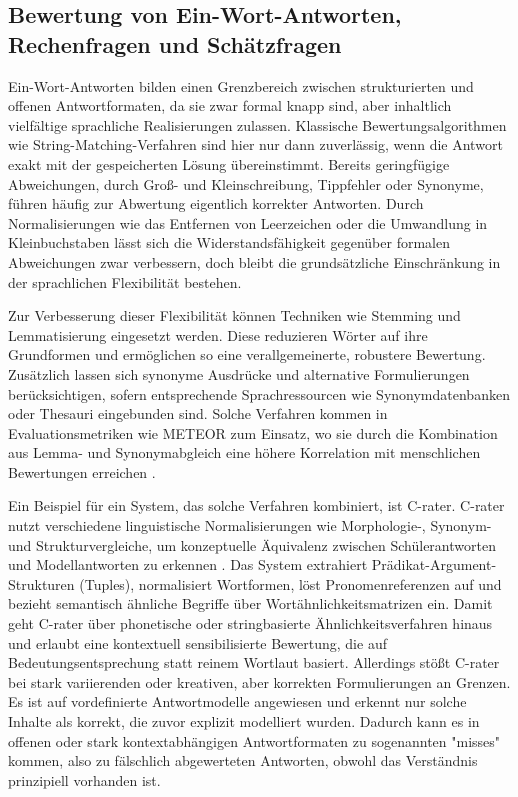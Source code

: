 \documentclass[a4paper,12pt]{article}
\begin{document}
\subsection{Bewertung von Ein-Wort-Antworten, Rechenfragen und Schätzfragen}
Ein-Wort-Antworten bilden einen Grenzbereich zwischen strukturierten und offenen Antwortformaten, da sie zwar formal knapp sind, aber inhaltlich vielfältige sprachliche Realisierungen zulassen. Klassische Bewertungsalgorithmen wie String-Matching-Verfahren sind hier nur dann zuverlässig, wenn die Antwort exakt mit der gespeicherten Lösung übereinstimmt. Bereits geringfügige Abweichungen, durch Groß- und Kleinschreibung, Tippfehler oder Synonyme, führen häufig zur Abwertung eigentlich korrekter Antworten. Durch Normalisierungen wie das Entfernen von Leerzeichen oder die Umwandlung in Kleinbuchstaben lässt sich die Widerstandsfähigkeit gegenüber formalen Abweichungen zwar verbessern, doch bleibt die grundsätzliche Einschränkung in der sprachlichen Flexibilität bestehen.

Zur Verbesserung dieser Flexibilität können Techniken wie Stemming und Lemmatisierung eingesetzt werden. Diese reduzieren Wörter auf ihre Grundformen und ermöglichen so eine verallgemeinerte, robustere Bewertung. Zusätzlich lassen sich synonyme Ausdrücke und alternative Formulierungen berücksichtigen, sofern entsprechende Sprachressourcen wie Synonymdatenbanken oder Thesauri eingebunden sind. Solche Verfahren kommen in Evaluationsmetriken wie METEOR zum Einsatz, wo sie durch die Kombination aus Lemma- und Synonymabgleich eine höhere Korrelation mit menschlichen Bewertungen erreichen \parencite[Kapitel~35.6.2]{mitkov}.

Ein Beispiel für ein System, das solche Verfahren kombiniert, ist C-rater. C-rater nutzt verschiedene linguistische Normalisierungen wie Morphologie-, Synonym- und Strukturvergleiche, um konzeptuelle Äquivalenz zwischen Schülerantworten und Modellantworten zu erkennen \parencite[vgl.][S.~389ff.]{leacock}. Das System extrahiert Prädikat-Argument-Strukturen (Tuples), normalisiert Wortformen, löst Pronomenreferenzen auf und bezieht semantisch ähnliche Begriffe über Wortähnlichkeitsmatrizen ein. Damit geht C-rater über phonetische oder stringbasierte Ähnlichkeitsverfahren hinaus und erlaubt eine kontextuell sensibilisierte Bewertung, die auf Bedeutungsentsprechung statt reinem Wortlaut basiert. Allerdings stößt C-rater bei stark variierenden oder kreativen, aber korrekten Formulierungen an Grenzen. Es ist auf vordefinierte Antwortmodelle angewiesen und erkennt nur solche Inhalte als korrekt, die zuvor explizit modelliert wurden. Dadurch kann es in offenen oder stark kontextabhängigen Antwortformaten zu sogenannten "misses" kommen, also zu fälschlich abgewerteten Antworten, obwohl das Verständnis prinzipiell vorhanden ist.
\end{document}
